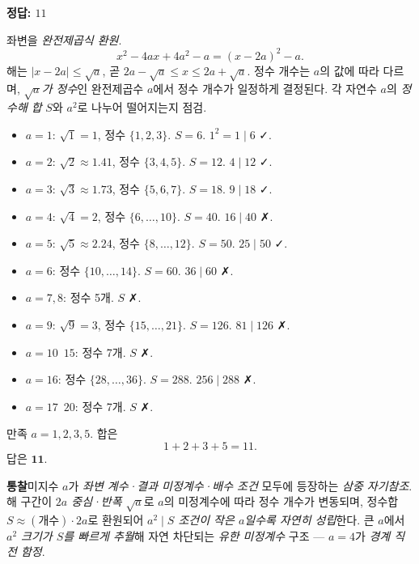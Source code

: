 \documentclass[10pt]{article}
\newcommand{\solnote}[1]{\par\smallskip\noindent
  \begin{tcolorbox}[enhanced, breakable, colback=vB-light, colframe=vB-light,
    boxrule=0pt, arc=3pt, left=10pt, right=10pt, top=4pt, bottom=4pt,
    fontupper=\sffamily\footnotesize\color{vB-ink}]
    \textbf{\color{vB-deep}통찰}\quad #1
  \end{tcolorbox}}
\begin{document}
\begin{answerbox}\sffamily\bfseries 정답: $11$\end{answerbox}
 좌변을 \emph{완전제곱식 환원}.
\[ x^2 - 4ax + 4a^2 - a = (x - 2a)^2 - a. \]
 해는 $|x - 2a| \le \sqrt{a}$, 곧 $2a - \sqrt{a} \le x \le 2a + \sqrt{a}$. 정수 개수는 $a$의 값에 따라 다르며, \emph{$\sqrt{a}$가 정수}인 완전제곱수 $a$에서 정수 개수가 일정하게 결정된다.
 각 자연수 $a$의 \emph{정수해 합} $S$와 $a^2$로 나누어 떨어지는지 점검.
\begin{itemize}\setlength{\itemsep}{0pt}
\item $a = 1$: $\sqrt{1} = 1$, 정수 $\{1, 2, 3\}$. $S = 6$. $1^2 = 1 \mid 6$ ✓.
\item $a = 2$: $\sqrt{2} \approx 1.41$, 정수 $\{3, 4, 5\}$. $S = 12$. $4 \mid 12$ ✓.
\item $a = 3$: $\sqrt{3} \approx 1.73$, 정수 $\{5, 6, 7\}$. $S = 18$. $9 \mid 18$ ✓.
\item $a = 4$: $\sqrt{4} = 2$, 정수 $\{6, \ldots, 10\}$. $S = 40$. $16 \mid 40$ ✗.
\item $a = 5$: $\sqrt{5} \approx 2.24$, 정수 $\{8, \ldots, 12\}$. $S = 50$. $25 \mid 50$ ✓.
\item $a = 6$: 정수 $\{10, \ldots, 14\}$. $S = 60$. $36 \mid 60$ ✗.
\item $a = 7, 8$: 정수 5개. $S$ ✗.
\item $a = 9$: $\sqrt{9} = 3$, 정수 $\{15, \ldots, 21\}$. $S = 126$. $81 \mid 126$ ✗.
\item $a = 10$~$15$: 정수 7개. $S$ ✗.
\item $a = 16$: 정수 $\{28, \ldots, 36\}$. $S = 288$. $256 \mid 288$ ✗.
\item $a = 17$~$20$: 정수 7개. $S$ ✗.
\end{itemize}
 만족 $a = 1, 2, 3, 5$. 합은
\[ 1 + 2 + 3 + 5 = 11. \]
답은 $\textbf{11}$.
\solnote{미지수 $a$가 \emph{좌변 계수·결과 미정계수·배수 조건} 모두에 등장하는 \emph{삼중 자기참조}. 해 구간이 \emph{$2a$ 중심·반폭 $\sqrt{a}$}로 $a$의 미정계수에 따라 정수 개수가 변동되며, 정수합 $S \approx (\text{개수}) \cdot 2a$로 환원되어 \emph{$a^2 \mid S$ 조건이 작은 $a$일수록 자연히 성립}한다. 큰 $a$에서 \emph{$a^2$ 크기가 $S$를 빠르게 추월}해 자연 차단되는 \emph{유한 미정계수} 구조 — $a = 4$가 \emph{경계 직전 함정}.}
\end{document}
